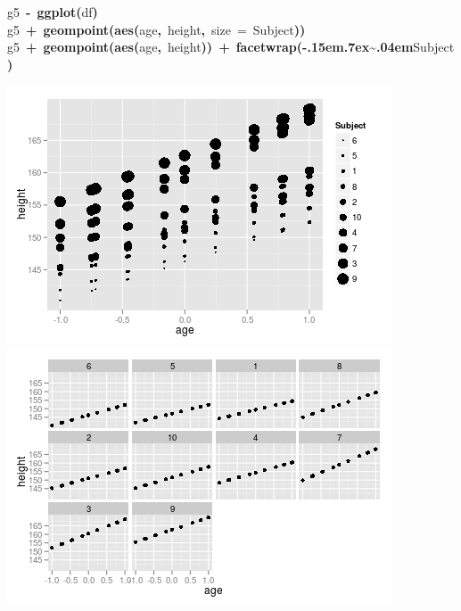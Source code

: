 \documentclass{article}
\makeatletter
\newcommand{\hlfunctioncall}[1]{\textcolor[rgb]{.5,0,.33}{\textbf{#1}}}%
\newcommand{\hlkeyword}[1]{\textbf{#1}}%
\newcommand{\hlargument}[1]{\textcolor[rgb]{.69,.25,.02}{#1}}%
\newcommand{\hlassignement}[1]{\textbf{#1}}%
\newcommand{\hlsymbol}[1]{#1}%
\def\urltilda{\kern -.15em\lower .7ex\hbox{\~{}}\kern .04em}%
\newcommand{\hlstd}[1]{\textcolor[rgb]{0,0,0}{#1}}%
\newenvironment{kframe}{%
 \def\FrameCommand##1{\hskip\@totalleftmargin \hskip-\fboxsep
 \colorbox{shadecolor}{##1}\hskip-\fboxsep
     \hskip-\linewidth \hskip-\@totalleftmargin \hskip\columnwidth}%
 \MakeFramed {\advance\hsize-\width
   \@totalleftmargin\z@ \linewidth\hsize
   \@setminipage}}%
 {\par\unskip\endMakeFramed}
\newenvironment{knitrout}{}{} %
\makeatother
\begin{document}
\begin{knitrout}
{\begin{kframe}
\begin{flushleft}
\hlstd{}\hspace*{\fill}\\
\hlstd{}\hspace*{\fill}\\
\hlstd{}\hlsymbol{g5}{\ }\hlassignement{\usebox{\hlnormalsizeboxlessthan}-}{\ }\hlfunctioncall{ggplot}\hlkeyword{(}\hlsymbol{df}\hlkeyword{)}\hspace*{\fill}\\
\hlstd{}\hlsymbol{g5}{\ }\hlkeyword{+}{\ }\hlfunctioncall{geom\usebox{\hlnormalsizeboxunderscore}point}\hlkeyword{(}\hlfunctioncall{aes}\hlkeyword{(}\hlsymbol{age}\hlkeyword{,}{\ }\hlsymbol{height}\hlkeyword{,}{\ }\hlargument{size}{\ }\hlargument{=}{\ }\hlsymbol{Subject}\hlkeyword{)}\hlkeyword{)}\hspace*{\fill}\\
\hlstd{}\hlsymbol{g5}{\ }\hlkeyword{+}{\ }\hlfunctioncall{geom\usebox{\hlnormalsizeboxunderscore}point}\hlkeyword{(}\hlfunctioncall{aes}\hlkeyword{(}\hlsymbol{age}\hlkeyword{,}{\ }\hlsymbol{height}\hlkeyword{)}\hlkeyword{)}{\ }\hlkeyword{+}{\ }\hlfunctioncall{facet\usebox{\hlnormalsizeboxunderscore}wrap}\hlkeyword{(}\hlkeyword{\urltilda{}}\hlsymbol{Subject}\hlkeyword{)}\mbox{}
\normalfont
\end{flushleft}


\centering{}\includegraphics{ox-simulate1} \includegraphics{ox-simulate2} 

\end{kframe}}
\end{knitrout}
\end{document}
